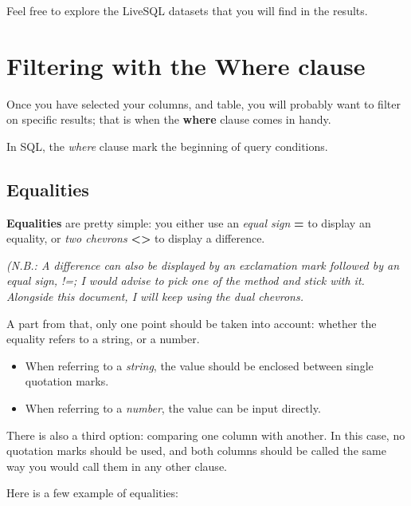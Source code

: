 \documentclass[12pt, letterpaper]{report}
\begin{document}
Feel free to explore the LiveSQL datasets that you will find in the results.

\chapter{Filtering with the Where clause}

Once you have selected your columns, and table, you will probably want to filter on specific results; that is when the \textbf{where} clause comes in handy.

In SQL, the \textit{where} clause mark the beginning of query conditions.

\section{Equalities}

\textbf{Equalities} are pretty simple: you either use an \textit{equal sign} \textbf{=} to display an equality, or \textit{two chevrons} \textbf{<>} to display a difference.

\textit{(N.B.: A difference can also be displayed by an exclamation mark followed by an equal sign, !=; I would advise to pick one of the method and stick with it. Alongside this document, I will keep using the dual chevrons.}

A part from that, only one point should be taken into account: whether the equality refers to a string, or a number.

\begin{itemize}
	\item When referring to a \textit{string}, the value should be enclosed between single quotation marks.
	\item When referring to a \textit{number}, the value can be input directly.
\end{itemize}

There is also a third option: comparing one column with another. In this case, no quotation marks should be used, and both columns should be called the same way you would call them in any other clause.

Here is a few example of equalities:






\end{document}
